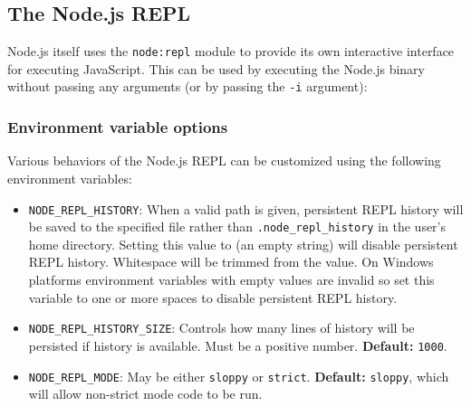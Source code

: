 \subsection{The Node.js REPL}\label{the-node.js-repl}

Node.js itself uses the \texttt{node:repl} module to provide its own
interactive interface for executing JavaScript. This can be used by
executing the Node.js binary without passing any arguments (or by
passing the \texttt{-i} argument):

\begin{Shaded}
\begin{Highlighting}[]
\NormalTok{[ 1, 2, 3 ]}
\end{Highlighting}
\end{Shaded}

\subsubsection{Environment variable
options}\label{environment-variable-options}

Various behaviors of the Node.js REPL can be customized using the
following environment variables:

\begin{itemize}
\tightlist
\item
  \texttt{NODE\_REPL\_HISTORY}: When a valid path is given, persistent
  REPL history will be saved to the specified file rather than
  \texttt{.node\_repl\_history} in the user's home directory. Setting
  this value to \texttt{\textquotesingle{}\textquotesingle{}} (an empty
  string) will disable persistent REPL history. Whitespace will be
  trimmed from the value. On Windows platforms environment variables
  with empty values are invalid so set this variable to one or more
  spaces to disable persistent REPL history.
\item
  \texttt{NODE\_REPL\_HISTORY\_SIZE}: Controls how many lines of history
  will be persisted if history is available. Must be a positive number.
  \textbf{Default:} \texttt{1000}.
\item
  \texttt{NODE\_REPL\_MODE}: May be either
  \texttt{\textquotesingle{}sloppy\textquotesingle{}} or
  \texttt{\textquotesingle{}strict\textquotesingle{}}. \textbf{Default:}
  \texttt{\textquotesingle{}sloppy\textquotesingle{}}, which will allow
  non-strict mode code to be run.
\end{itemize}

